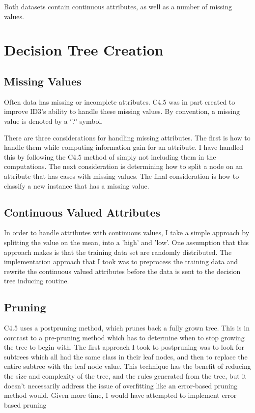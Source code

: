 \documentclass[letterpaper]{article}
\begin{document}
Both datasets contain continuous attributes, as well as a number of missing values.

\section{Decision Tree Creation}


\subsection{Missing Values}
Often data has missing or incomplete attributes. C4.5 was in part created to improve ID3's ability to handle these missing values. By convention, a missing value is denoted by a `?' symbol.

There are three considerations for handling missing attributes. The first is how to handle them while computing information gain for an attribute. I have handled this by following the C4.5 method of simply not including them in the computations. The next consideration is determining how to split a node on an attribute that has cases with missing values. The final consideration is how to classify a new instance that has a missing value.

\subsection{Continuous Valued Attributes}

In order to handle attributes with continuous values, I take a simple approach by splitting the value on the mean, into a 'high' and 'low'.  One assumption that this approach makes is that the training data set are randomly distributed. The implementation approach that I took was to preprocess the training data and rewrite the continuous valued attributes before the data is sent to the decision tree inducing routine.

\subsection{Pruning}
C4.5 uses a postpruning method, which prunes back a fully grown tree. This is in contrast to a pre-pruning method which has to determine when to stop growing the tree to begin with. The first approach I took to postpruning was to look for subtrees which all had the same class in their leaf nodes, and then to replace the entire subtree with the leaf node value. This technique has the benefit of reducing the size and complexity of the tree, and the rules generated from the tree, but it doesn't necessarily address the issue of overfitting like an error-based pruning method would. Given more time, I would have attempted to implement error based pruning 
\end{document}
